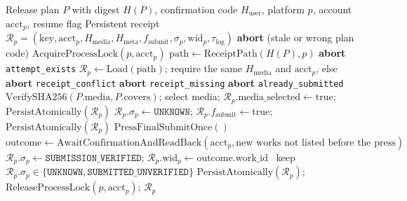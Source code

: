 \documentclass[11pt,a4paper]{article}
\theoremstyle{definition}
\begin{document}
\begin{algorithm}[htbp]
\caption{Idempotent Cross-Platform Publication \& \texttt{UNKNOWN}-State Latching (\texttt{vpub publish} \& \texttt{vpub verify})}
\label{alg:publish}
\footnotesize
\begin{algorithmic}[1]
\Require Release plan $P$ with digest $H(P)$, confirmation code $H_{\text{user}}$, platform $p$, account $\text{acct}_p$, resume flag
\Ensure Persistent receipt $\mathcal{R}_p = (\text{key}, \text{acct}_p, H_{\text{media}}, H_{\text{meta}}, f_{\text{submit}}, \sigma_p, \text{wid}_p, \tau_{\text{log}})$
 \textbf{abort} (stale or wrong plan code) \EndIf
\State $\text{AcquireProcessLock}(p, \text{acct}_p)$ 
\State $\text{path} \gets \text{ReceiptPath}(H(P), p)$
 \textbf{abort} \texttt{attempt\_exists}  \EndIf
{} $\mathcal{R}_p \gets \text{Load}(\text{path})$; require the same $H_{\text{media}}$ and $\text{acct}_p$, else \textbf{abort} \texttt{receipt\_conflict} \EndIf
{} \textbf{abort} \texttt{receipt\_missing} \EndIf
{} \textbf{abort} \texttt{already\_submitted} \EndIf
\State $\text{VerifySHA256}(P.\text{media}, P.\text{covers})$; select media; $\mathcal{R}_p.\text{media\_selected} \gets \text{true}$; $\text{PersistAtomically}(\mathcal{R}_p)$
\State $\mathcal{R}_p.\sigma_p \gets \texttt{UNKNOWN}$; $\mathcal{R}_p.f_{\text{submit}} \gets \text{true}$; $\text{PersistAtomically}(\mathcal{R}_p)$ 
\State $\text{PressFinalSubmitOnce}()$ 
\State $\text{outcome} \gets \text{AwaitConfirmationAndReadBack}(\text{acct}_p, \text{new works not listed before the press})$
 $\mathcal{R}_p.\sigma_p \gets \texttt{SUBMISSION\_VERIFIED}$; $\mathcal{R}_p.\text{wid}_p \gets \text{outcome}.\text{work\_id}$
\Else\ keep $\mathcal{R}_p.\sigma_p \in \{\texttt{UNKNOWN}, \texttt{SUBMITTED\_UNVERIFIED}\}$ 
\EndIf
\State $\text{PersistAtomically}(\mathcal{R}_p)$; $\text{ReleaseProcessLock}(p, \text{acct}_p)$; \Return $\mathcal{R}_p$
\end{algorithmic}
\end{algorithm}
\end{document}
